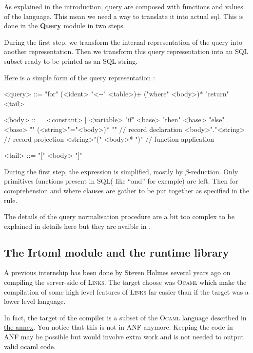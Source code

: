 \documentclass[11pt]{article}
\newcommand\mysc[1]{{\rmfamily\textsc{#1}}\xspace}
\newcommand\links{\mysc{Links}}
\newcommand\sql{\mysc{SQL}}
\newcommand\ocaml{\mysc{Ocaml}}
\newcommand\module[1]{{\bf #1}}
\renewcommand\comment[1]{{\color{gray} $//$ #1}}
\begin{document}
As explained in the introduction, query are composed with functions and values of the language. This mean we need a way to translate it into actual sql. This is done in the \module{Query} module in two steps.

During the first step, we transform the internal representation of the query into another representation. Then we transform this query representation into an \sql subset ready to be printed as an \sql string.

Here is a simple form of the query representation :

\begin{grammar}
<query> ::= "for" (<ident> "<-\--" <table>)+ ("where" <body>)* "return" <tail>

<body> ::= \ 
\alt <constant> | <variable>
\alt "if" <base> "then" <base> "else" <base>
\alt "{" (<string>"="<body>)* "}" \comment{record declaration}
\alt <body>"."<string> \comment{record projection}
\alt <string>"(" <body>* ")" \comment{function application}

<tail> ::= "[" <body> "]"
\end{grammar}

During the first step, the expression is simplified, mostly by $\beta$-reduction. Only primitives functions present in \sql ( like ``and'' for exemple) are left. Then for comprehension and where clauses are gather to be put together as specified in the  rule.

The details of the query normalisation procedure are a bit too complex to be explained in details here but they are avaible in \cite{links:querycomp}.

\subsection{The Irtoml module and the runtime library \label{irtoml}}

A previous internship \cite{links:comp} has been done by Steven Holmes several years ago on compiling the server-side of \links. The target choose was \ocaml which make the compilation of some high level features of \links far easier than if the target was a lower level language. 

In fact, the target of the compiler is a subset of the \ocaml language described in \hyperref[ocamlsubset]{the annex}. You notice that this is not in ANF anymore. Keeping the code in ANF may be possible but would involve extra work and is not needed to output valid ocaml code.
\end{document}
